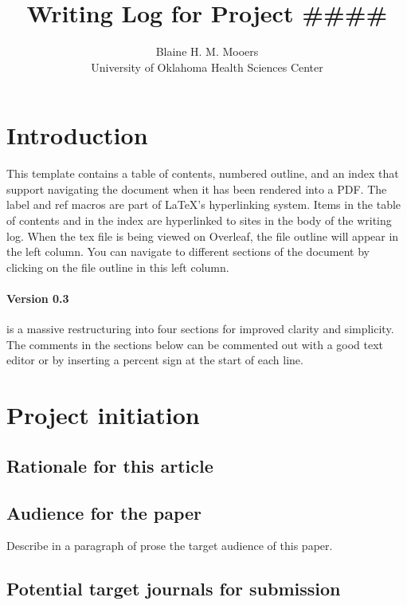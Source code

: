 \documentclass[10pt,letterpaper]{article}
\title{Writing Log for Project \#\#\#\#}
\author{Blaine H. M. Mooers \\University of Oklahoma Health Sciences Center}
\begin{document}
\maketitle
\tableofcontents


\section*{Introduction}


This template contains a table of contents, numbered outline, and an index that support navigating the document when it has been rendered into a PDF. 
The label and ref macros are part of LaTeX's hyperlinking system.
Items in the table of contents and in the index are hyperlinked to sites in the body of the writing log.
When the tex file is being viewed on Overleaf, the file outline will appear in the left column.
You can navigate to different sections of the document by clicking on the file outline in this left column.

\paragraph*{Version 0.3} is a massive restructuring into four sections for improved clarity and simplicity.
The comments in the sections below can be commented out with a good text editor or by inserting a percent sign at the start of each line.


\section{Project initiation}
\subsection{Rationale for this article}
\label{sub:why}



\subsection{Audience for the paper}
\label{sub:audience}
Describe in a paragraph of prose the target audience of this paper.



\subsection{Potential target journals for submission}
\label{sub:target-journals}
\end{document}
